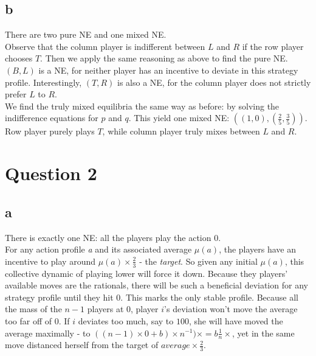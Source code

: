 \documentclass[10pt,a4paper]{article}
\begin{document}
\subsection*{b}
There are two pure NE and one mixed NE.\\
Observe that the column player is indifferent between $L$ and $R$ if the row player chooses $T$. Then we apply the same reasoning as above to find the pure NE. $(B,L)$ is a NE, for neither player has an incentive to deviate in this strategy profile. Interestingly, $(T,R)$ is also a NE, for the column player does not strictly prefer $L$ to $R$.\\
We find the truly mixed equilibria the same way as before: by solving the indifference equations for $p$ and $q$.
This yield one mixed NE: $((1,0),(\tfrac{2}{5},\tfrac{3}{5}))$. Row player purely plays $T$, while column player truly mixes between $L$ and $R$.
\section*{Question 2}
\subsection*{a}
There is exactly one NE: all the players play the action $0$. \\
For any action profile \textit{a} and its associated average $\mu(\textit{a})$, the players have an incentive to play around $\mu(\textit{a})\times \tfrac{2}{3}$ - the \textit{target}. So given any initial $\mu(\textit{a})$, this collective dynamic of playing lower will force it down. Because they players' available moves are the rationals, there will be such a beneficial deviation for any strategy profile until they hit $0$. This marks the only stable profile. Because all the mass of the $n-1$ players at $0$, player $i$'s deviation won't move the average too far off of $0$. If $i$ deviates too much, say to $100$, she will have moved the average maximally - to $((n-1)\times 0 + b)\times n^{-1})\times=b \tfrac{1}{n}\times$, yet in the same move distanced herself from the target of $average \times \tfrac{2}{3}$.
\end{document}
